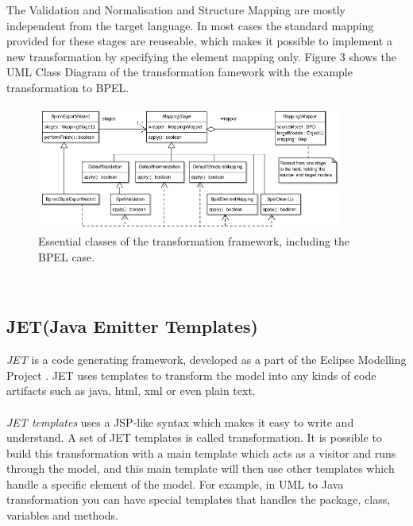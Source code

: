 The Validation and Normalisation and Structure Mapping are mostly independent from the target language. In most cases the standard mapping provided for these stages are reuseable, which makes it possible to implement a new transformation by specifying the element mapping only. Figure 3 shows the UML Class Diagram of the transformation famework with the example transformation to BPEL.
\begin{figure}[h]
	\centering
		\includegraphics[width=0.90\textwidth]{images/transformation.png}
	\caption{Essential classes of the transformation framework, including the BPEL case.\cite{3}}
	\label{fig:transform}
\end{figure}\\


\subsection{JET(Java Emitter Templates)}
\textit{JET}\cite{13} is a code generating framework, developed as a part of the Eclipse Modelling Project \cite{14}. JET uses templates to transform the model into any kinds of code artifacts such as java, html, xml or even plain text. \\\\
\textit{JET templates} uses a JSP-like syntax which makes it easy to write and understand. A set of JET templates is called transformation. It is possible to build this transformation with a main template which acts as a visitor and runs through the model, and this main template will then use other templates which handle a specific element of the model. For example, in UML to Java transformation you can have special templates that handles the package, class, variables and methods.
